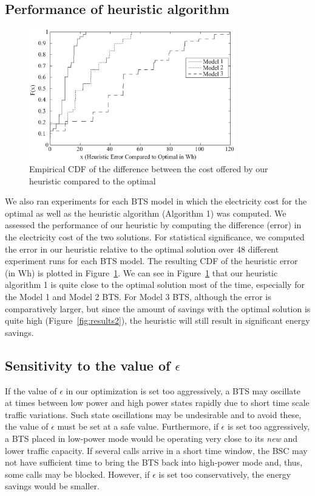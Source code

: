 \subsection{Performance of heuristic algorithm}
\label{subsec:heur1-results}
\begin{figure}
\centering
\includegraphics[width=0.8\textwidth]{pics/ilyas6.eps}
\caption{Empirical CDF of the difference between the cost offered by our heuristic compared to the optimal}
\label{fig:results5}
\end{figure}

We also ran experiments for each BTS model in which the electricity cost for the optimal as well as the heuristic algorithm (Algorithm 1) was computed. We assessed the performance of our heuristic by computing the difference (error) in the electricity cost of the two solutions. For statistical significance, we computed the error in our heuristic relative to the optimal solution over 48 different experiment runs for each BTS model. The resulting CDF of the heuristic error (in Wh) is plotted in Figure~\ref{fig:results5}. We can see in Figure~\ref{fig:results5} that our heuristic algorithm 1 is quite close to the optimal solution most of the time, especially for the Model 1 and Model 2 BTS. For Model 3 BTS, although the error is comparatively larger, but since the amount of savings with the optimal solution is quite high (Figure~\ref{fig:results2}), the heuristic will still result in significant energy savings.

\subsection{Sensitivity to the value of $\epsilon$}
\label{subsec:results3}
If the value of $\epsilon$ in our optimization is set too aggressively, a BTS may oscillate at times between low power and high power states rapidly due to short time scale traffic variations. Such state oscillations may be undesirable and to avoid these, the value of $\epsilon$ must be set at a safe value. Furthermore, if $\epsilon$ is set too aggressively, a BTS placed in low-power mode would be operating very close to its \textit{new} and lower traffic capacity. If several calls arrive in a short time window, the BSC may not have sufficient time to bring the BTS back into high-power mode and, thus, some calls may be blocked. However, if $\epsilon$ is set too conservatively, the energy savings would be smaller.


